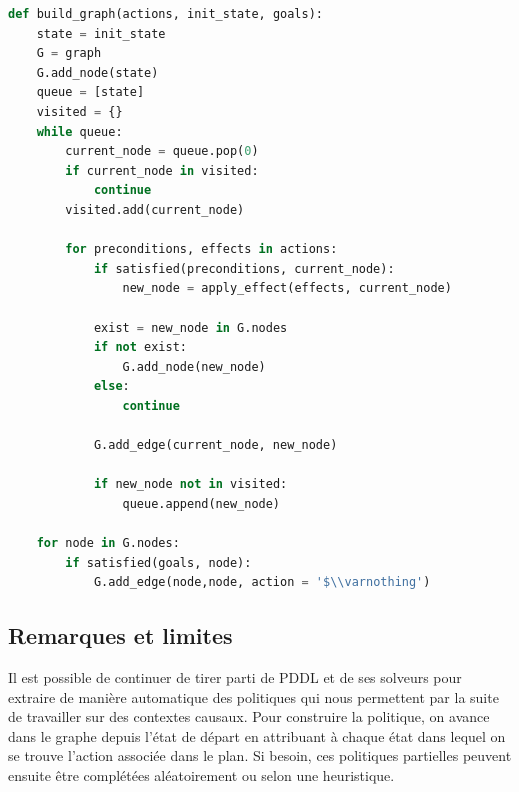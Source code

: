 \hfill
\begin{lstlisting}[language=Python,basicstyle=\ttfamily\footnotesize,
                   commentstyle=\color{gray}\itshape,
                   keywordstyle=\bfseries]
def build_graph(actions, init_state, goals):
    state = init_state
    G = graph
    G.add_node(state)
    queue = [state]
    visited = {}
    while queue:
        current_node = queue.pop(0)
        if current_node in visited:
            continue
        visited.add(current_node)

        for preconditions, effects in actions:
            if satisfied(preconditions, current_node):
                new_node = apply_effect(effects, current_node)

            exist = new_node in G.nodes
            if not exist:
                G.add_node(new_node)
            else:
                continue
            
            G.add_edge(current_node, new_node)

            if new_node not in visited:
                queue.append(new_node)
    
    for node in G.nodes:
        if satisfied(goals, node):
            G.add_edge(node,node, action = '$\\varnothing')

\end{lstlisting}
\hfill



\subsection{Remarques et limites}

Il est possible de continuer de tirer parti de PDDL et de ses solveurs pour extraire de manière automatique des politiques qui nous permettent par la suite de travailler sur des contextes causaux. Pour construire la politique, on avance dans le graphe depuis l'état de départ en attribuant à chaque état dans lequel on se trouve l'action associée dans le plan. Si besoin, ces politiques partielles peuvent ensuite être complétées aléatoirement ou selon une heuristique.

